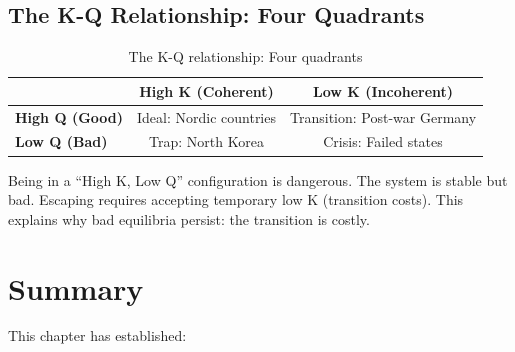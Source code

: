 \subsection{The K-Q Relationship: Four Quadrants}

\begin{table}[h]
\centering
\begin{tabular}{lcc}
\toprule
& \textbf{High K (Coherent)} & \textbf{Low K (Incoherent)} \\
\midrule
\textbf{High Q (Good)} & Ideal: Nordic countries & Transition: Post-war Germany \\
\textbf{Low Q (Bad)} & Trap: North Korea & Crisis: Failed states \\
\bottomrule
\end{tabular}
\caption{The K-Q relationship: Four quadrants}
\label{tab:k-q-quadrants}
\end{table}

\begin{intuition}
Being in a ``High K, Low Q'' configuration is dangerous.
The system is stable but bad.
Escaping requires accepting temporary low K (transition costs).
This explains why bad equilibria persist: the transition is costly.
\end{intuition}



\section{Summary}
\label{sec:fepsde-summary}


This chapter has established:

